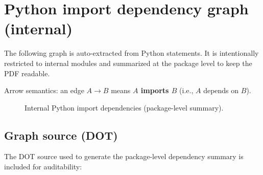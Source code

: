 \clearpage
\section{Python import dependency graph (internal)}
The following graph is auto-extracted from Python  statements. It is intentionally restricted to internal modules and summarized at the package level to keep the PDF readable.

Arrow semantics: an edge $A \to B$ means \textbf{$A$ imports $B$} (i.e., $A$ depends on $B$).

\begin{figure}[h]
\centering

\caption{Internal Python import dependencies (package-level summary).}
\end{figure}

\subsection{Graph source (DOT)}
The DOT source used to generate the package-level dependency summary is included for auditability:



